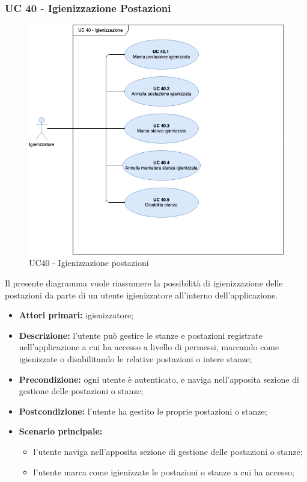 \subsubsection{UC 40 - Igienizzazione Postazioni}

\begin{figure}[h]
  \centering
    \includegraphics[scale=0.5]{src/CasiDUso/Immagini/UC40.png}
  \caption{UC40  - Igienizzazione postazioni}
\end{figure}

Il presente diagramma vuole riassumere la possibilità di igienizzazione delle postazioni da parte di un utente igienizzatore all'interno dell’applicazione.

\begin{itemize}
\item \textbf{Attori primari:} igienizzatore;
\item \textbf{Descrizione:} l’utente può gestire le stanze e postazioni registrate nell’applicazione a cui ha accesso a livello di permessi, marcando come igienizzate o disabilitando le relative postazioni o intere stanze;
\item \textbf{Precondizione:} ogni utente è autenticato, e naviga nell’apposita sezione di gestione delle postazioni o stanze;
\item \textbf{Postcondizione:} l’utente ha gestito le proprie postazioni o stanze;
\item \textbf{Scenario principale:} 
	\begin{itemize}
		\item l’utente naviga nell’apposita sezione di gestione delle postazioni o stanze;
		\item l’utente marca come igienizzate le postazioni o stanze a cui ha accesso;
	\end{itemize}
\end{itemize}

